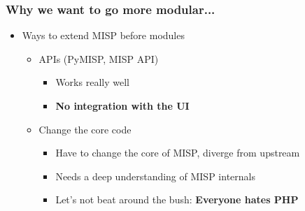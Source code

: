 

\begin{frame}[t,plain]
\titlepage
\end{frame}

\begin{frame}[fragile]
        \frametitle{Why we want to go more modular...}
        \begin{itemize}
        \item Ways to extend MISP before modules
            \begin{itemize}
            \item APIs (PyMISP, MISP API)
                \begin{itemize}
                    \item Works really well
                    \item {\bf No integration with the UI}
                \end{itemize}
            \item Change the core code
                \begin{itemize}
                    \item Have to change the core of MISP, diverge from upstream
                    \item Needs a deep understanding of MISP internals
                    \item Let's not beat around the bush: {\bf Everyone hates PHP}
                \end{itemize}
            \end{itemize}
        \end{itemize}
\end{frame}

